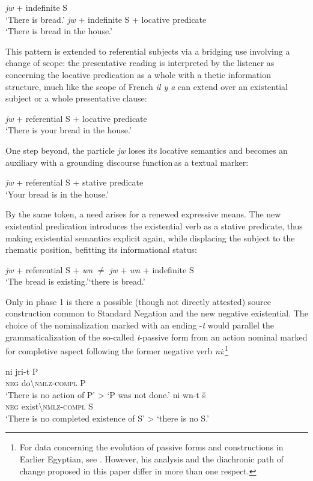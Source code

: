 \documentclass[output=paper,draft,draftmode,colorlinks,citecolor=brown]{langscibook}
\begin{document}
\ea 
    \ea \textit{jw} + indefinite S\\ 
    \glt ‘There is bread.’ 
    \ex \textit{jw} + indefinite S + locative predicate\\
    \glt ‘There is bread in the house.’ 
\z \z 

This pattern is extended to referential subjects via a bridging use involving a change of scope: the presentative reading is interpreted by the listener as concerning the locative predication as a whole with a thetic information structure, much like the scope of French \textit{il y a} can extend over an existential subject or a whole presentative clause: 

\ea \textit{jw} + referential S + locative predicate\\  
    \glt ‘There is your bread in the house.’ 
\z

One step beyond, the particle \textit{jw} loses its locative semantics and becomes an auxiliary with a grounding discourse function as a textual marker: 
 
\ea  \textit{jw} + referential S + stative predicate\\ 
    \glt ‘Your bread is in the house.’ 
\z 

By the same token, a need arises for a renewed expressive means. The new existential predication introduces the existential verb as a stative predicate, thus making existential semantics explicit again, while displacing the subject to the rhematic position, befitting its informational status:  
 
\ea  \textit{jw} + referential S + \textit{wn} $≠$ \textit{jw} + \textit{wn} + indefinite S\\ 
    \glt ‘The bread is existing.’‘there is bread.’ 
\z 

Only in phase 1 is there a possible (though not directly attested) source construction common to Standard Negation and the new negative existential. The choice of the nominalization marked with an ending -\textit{t} would parallel the grammaticalization of the so-called \textit{t}-passive form from an action nominal marked for completive aspect following the former negative verb \textit{ni}:\footnote{For data concerning the evolution of passive forms and constructions in Earlier Egyptian, see \citet{Stauder2014b}. However, his analysis and the diachronic path of change proposed in this paper differ in more than one respect.}

\ea 
    \ea 
    \gll ni jri-t P\\ 
    \textsc{neg} do\textbackslash\textsc{nmlz-compl} P\\ 
    \glt ‘There is no action of P’ > ‘P was not done.’ 
    \ex 
    \gll ni wn-t š\\
    \textsc{neg} exist\textbackslash\textsc{nmlz-compl} S\\
    \glt ‘There is no completed existence of S’ > ‘there is no S.’ 
\z \z 
\end{document}
